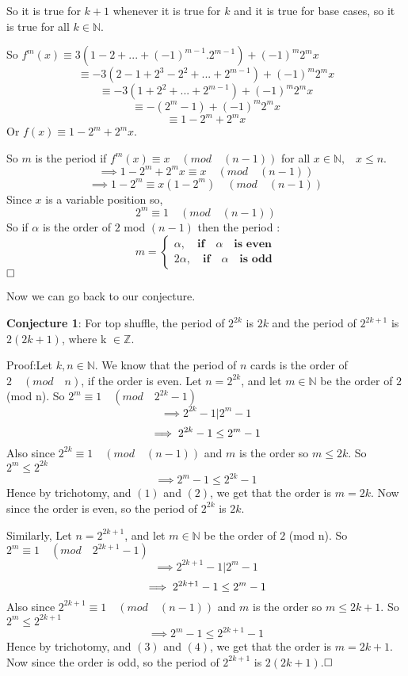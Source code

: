\documentclass[10pt]{article}
\begin{document}
So it is true for $k+1$ whenever it is true for $k$ and it is true for base cases, so it is true for all $k\in\mathbb{N}$.

\vspace{6mm}

So $f^m(x)\equiv3(1-2+...+(-1)^{m-1}.2^{m-1})+(-1)^{m}2^mx$
$$\equiv-3(2-1+2^3-2^2+...+2^{m-1})+(-1)^m2^mx$$ $$\equiv-3(1+2^2+...+2^{m-1})+(-1)^m2^mx$$ $$\equiv-(2^m-1)+(-1)^m2^mx$$ $$\equiv 1-2^m+2^mx$$
Or $f(x)\equiv1-2^m+2^mx$.

So $m$ is the period if $f^m(x)\equiv x\quad(mod\quad(n-1))$ for all $x\in\mathbb{N}\text{,}\quad x\leq n$.
$$\implies 1-2^m+ 2^mx\equiv x\quad(mod \quad(n-1))$$$$\implies 1-2^m\equiv x(1-2^m)\quad(mod\quad(n-1))$$
Since $x$ is a variable position so,
$$2^m\equiv 1\quad(mod\quad(n-1))$$
So if $\alpha$ is the order of $2$ mod $(n-1)$ then the period :
$$m=
\begin{cases}
\alpha, \quad\textbf{if} \quad \alpha\quad \textbf{is even}\\
2\alpha,\quad \textbf{if}\quad \alpha\quad \textbf{is odd}
\end{cases}$$
$\hfill\square$

\vspace{7mm}
Now we can go back to our conjecture.

{\textbf{Conjecture 1}}: For top shuffle, the period of $2^{2k}$ is $2k$ and the period of $2^{2k+1}$ is $2 (2k+1)$, where k $\in\mathbb{Z}$.

Proof:Let $k,n\in\mathbb{N}$. We know that the period of $n$ cards is the order of $2\quad (mod\quad n)$, if the order is even.
Let $n=2^{2k}$, and let $m\in\mathbb{N}$ be the order of $2$ (mod n).
So $2^m\equiv1\quad(mod\quad2^{2k}-1)$$$\implies2^{2k}-1\vert 2^m-1$$ 
\begin{equation}
\implies2^{2k}-1\leq 2^m-1\hfill
\end{equation}
Also since $2^{2k}\equiv 1\quad (mod\quad(n-1))$ and $m$ is the order so $m\leq 2k$. So $2^m\leq2^{2k}$
\begin{equation}
\implies 2^m-1\leq 2^{2k}-1
\end{equation}
Hence by trichotomy, and $(1)$ and $(2)$, we get that the order is $m=2k$. Now since the order is even, so the period of $2^{2k}$ is $2k$.

Similarly, Let $n=2^{2k+1}$, and let $m\in\mathbb{N}$ be the order of $2$ (mod n).
So $2^m\equiv1\quad(mod\quad2^{2k+1}-1)$$$\implies2^{2k+1}-1\vert 2^m-1$$ 
\begin{equation}
\implies2^{2k+1}-1\leq 2^m-1\hfill
\end{equation}
Also since $2^{2k+1}\equiv 1\quad (mod\quad(n-1))$ and $m$ is the order so $m\leq 2k+1$. So $2^m\leq2^{2k+1}$
\begin{equation}
\implies 2^m-1\leq 2^{2k+1}-1
\end{equation}
Hence by trichotomy, and $(3)$ and $(4)$, we get that the order is $m=2k+1$. Now since the order is odd, so the period of $2^{2k+1}$ is $2(2k+1)$.$\hfill\square$
\end{document}
